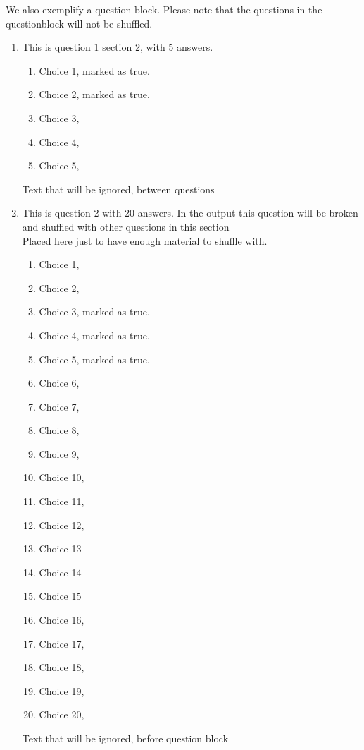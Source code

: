 \documentclass[a4paper,10pt]{article}%
\begin{document}
We also exemplify a question block. Please note that the questions in the questionblock will not be shuffled.
\begin{enumerate}[resume]
	
	\item This is question 1 section 2, with 5 answers.
	\begin{enumerate}
		\item Choice 1, marked as true. %
		\item Choice 2, marked as true. %
		\item Choice 3, 
		\item Choice 4,
		\item Choice 5,
	\end{enumerate}
		Text that will be ignored, between questions\\
		
	\item This is question 2 with 20 answers. In the output this question will be broken and shuffled with other questions in this section\\
	Placed here just to have enough material to shuffle with.
	\begin{enumerate}	
		\item Choice 1,
		\item Choice 2,
		\item Choice 3, marked as true. %
		\item Choice 4, marked as true. %
		\item Choice 5, marked as true. %
		\item Choice 6,
		\item Choice 7,
		\item Choice 8,
		\item Choice 9,
		\item Choice 10,
		\item Choice 11,
		\item Choice 12,
		\item Choice 13
		\item Choice 14
		\item Choice 15
		\item Choice 16,
		\item Choice 17,
		\item Choice 18,
		\item Choice 19,		
		\item Choice 20, %
	\end{enumerate}
	
	Text that will be ignored, before question block\\


\end{enumerate}
\end{document}
